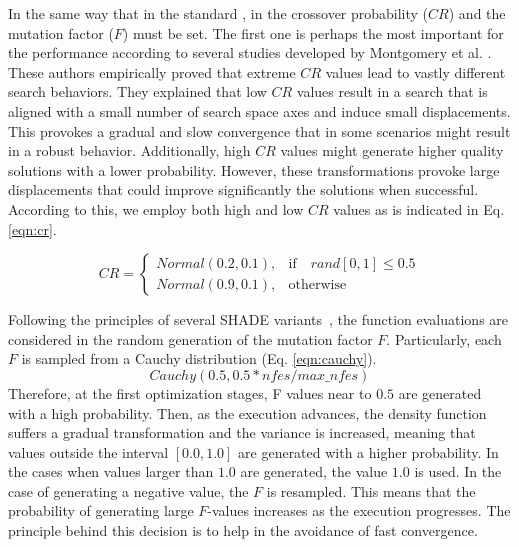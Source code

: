 %
In the same way that in the standard \DE{}, in \DEEDM{} the crossover probability ($CR$) and the mutation factor ($F$) must be set.
%
The first one is perhaps the most important for the performance according to several studies developed by Montgomery 
et al. \cite{montgomery2010analysis}.
%
These authors empirically proved that extreme $CR$ values lead to vastly different search behaviors.
%
They explained that low $CR$ values result in a search that is aligned with a small number of search space axes and
induce small displacements.
%
This provokes a gradual and slow convergence that in some scenarios might result in a robust behavior.
%
Additionally, high $CR$ values might generate higher quality solutions with a lower probability.
%
However, these transformations provoke large displacements that could improve significantly the solutions when successful.
%
According to this, we employ both high and low $CR$ values as is indicated in Eq. \ref{eqn:cr}.

\begin{equation} \label{eqn:cr}
CR = 
\begin{cases}
     Normal(0.2, 0.1),& \text{if} \quad rand[0,1] \leq 0.5  \\
     Normal(0.9, 0.1),              & \text{otherwise}
\end{cases}
\end{equation}

Following the principles of several SHADE variants~\cite{awad2016ensemble, brest2016shade}, the function evaluations are considered in the random generation of the mutation factor $F$.
%
Particularly, each $F$ is sampled from a Cauchy distribution (Eq. \ref{eqn:cauchy}).
\begin{equation}\label{eqn:cauchy}
 Cauchy(0.5, 0.5*nfes/max\_nfes)
\end{equation}
%
Therefore, at the first optimization stages, F values near to $0.5$ are generated with a high probability.
%
Then, as the execution advances, the density function suffers a gradual transformation and the variance is increased, meaning
that values outside the interval $[0.0, 1.0]$ are generated with a higher probability.
%
In the cases when values larger than $1.0$ are generated, the value $1.0$ is used.
%
In the case of generating a negative value, the $F$ is resampled.
%
This means that the probability of generating large $F$-values increases as the execution progresses.
%
The principle behind this decision is to help in the avoidance of fast convergence.


%


